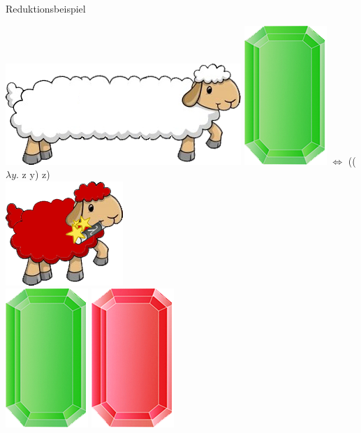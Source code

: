 \documentclass[18pt]{beamer}
\begin{document}
\begin{frame}{Reduktionsbeispiel}
	
	
	
\includegraphics[scale=1,7]{Pictures/lamb_long_white_wom}\thinspace \thinspace   
\includegraphics[scale=0.5]{Pictures/gem_green}
\thinspace \thinspace \thinspace \thinspace \thinspace \thinspace $\Leftrightarrow$ \thinspace \thinspace \thinspace \thinspace \thinspace \thinspace (($\lambda y. $ z y)  z)
\\[0.3cm]

\includegraphics[scale=1,7]{Pictures/lamb_red_wm}
\\[0.3cm]
\includegraphics[scale=0.5]{Pictures/gem_green}
\includegraphics[scale=0.5]{Pictures/gem_red}
	
	
	
\end{frame}
\end{document}

